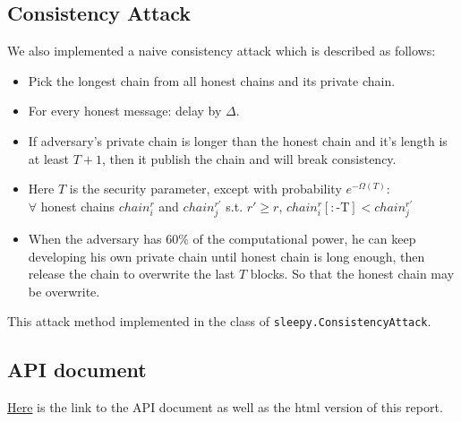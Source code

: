 \documentclass[
10pt, %
a4paper, %
oneside, %
headinclude,footinclude, %
BCOR5mm, %
]{scrartcl}
\begin{document}
\subsection{Consistency Attack}
We also implemented a naive consistency attack which is described as follows:
\begin{itemize}
	\item Pick the longest chain from all honest chains and its private chain.
	\item For every honest message: delay by $\Delta$.
	\item If adversary’s private chain is longer than the honest chain and it's length is at least $T + 1$, then it publish the chain and will break consistency.
	\item Here $T$ is the security parameter, except with probability $e^{-\Omega(T)}$: \\
	$\forall$ honest chains $chain^{r}_{i}$ and $chain_{j}^{r'}$ s.t. $r' \geq r$, $chain_{i}^r[:\text{-T}] < chain_j^{r'}$
	\item When the adversary has 60\% of the computational power, he can keep developing his own private chain until honest chain is long enough, then release the chain to overwrite the last $ T $ blocks. So that the honest chain may be overwrite.
\end{itemize}
This attack method implemented in the class of \verb|sleepy.ConsistencyAttack|.
\subsection{API document}
\href{https://abcdabcd987.github.io/distributed-consensus-simulator/api_doc.html}{Here} is the link to the API document as well as the html version of this report.


\end{document}
